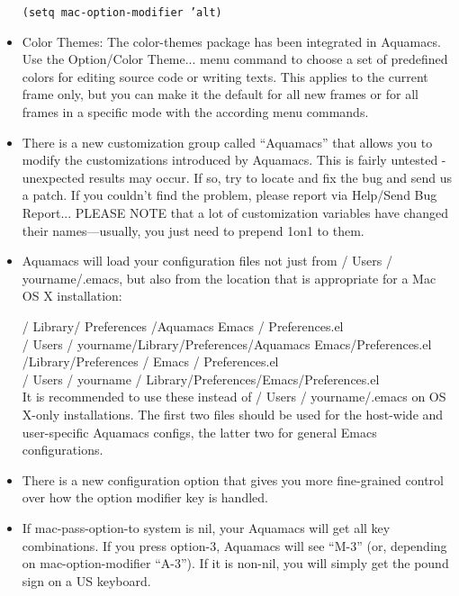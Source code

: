 \begin{itemize}
   \texttt{(setq mac-option-modifier 'alt)}
 

\item Color Themes: The color-themes package has been integrated in
    Aquamacs. Use the Option/Color Theme... menu command to choose a
    set of predefined colors for editing source code or writing
    texts. This applies to the current frame only, but you can make it
    the default for all new frames or for all frames in a specific
    mode with the according menu commands.

\item There is a new customization group called ``Aquamacs'' that
    allows you to modify the customizations introduced by Aquamacs.
    This is fairly untested - unexpected results may occur. If so, try
    to locate and fix the bug and send us a patch. If you couldn't
    find the problem, please report via Help/Send Bug Report...
    PLEASE NOTE that a lot of customization variables have changed
    their names---usually, you just need to prepend 1on1  to them.

\item Aquamacs will load your configuration files not just from
    / Users / yourname/.emacs, but also from the location that is appropriate for a Mac
    OS X installation:

/ Library/ Preferences /Aquamacs Emacs / Preferences.el\\
/ Users / yourname/Library/Preferences/Aquamacs Emacs/Preferences.el\\
  /Library/Preferences / Emacs / Preferences.el\\
 / Users / yourname / Library/Preferences/Emacs/Preferences.el\\

    It is recommended to use these instead of / Users / yourname/.emacs on OS X-only
    installations. The first two files should be used for the
    host-wide and user-specific Aquamacs configs, the latter two for
    general Emacs configurations.

\item There is a new configuration option that gives you more fine-grained
    control over how the option modifier key is handled.

\item If mac-pass-option-to system is nil, your Aquamacs will get all key
    combinations. If you press option-3, Aquamacs will see ``M-3'' (or,
    depending on mac-option-modifier ``A-3''). If it is non-nil, you
    will simply get the pound sign  on a US keyboard.
 

\end{itemize}
